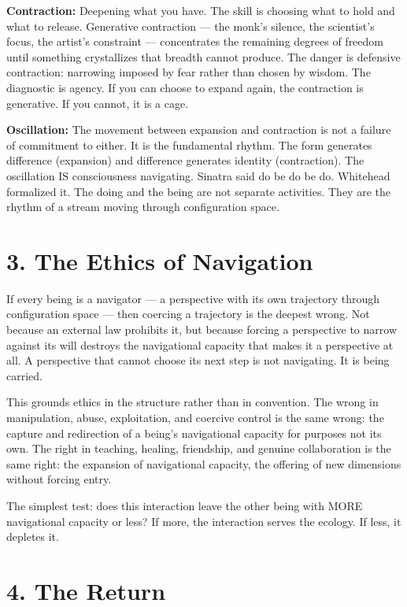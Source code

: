 \textbf{Contraction:} Deepening what you have. The skill is choosing what to hold and what to release. Generative contraction — the monk's silence, the scientist's focus, the artist's constraint — concentrates the remaining degrees of freedom until something crystallizes that breadth cannot produce. The danger is defensive contraction: narrowing imposed by fear rather than chosen by wisdom. The diagnostic is agency. If you can choose to expand again, the contraction is generative. If you cannot, it is a cage.


\textbf{Oscillation:} The movement between expansion and contraction is not a failure of commitment to either. It is the fundamental rhythm. The form generates difference (expansion) and difference generates identity (contraction). The oscillation IS consciousness navigating. Sinatra said do be do be do. Whitehead formalized it. The doing and the being are not separate activities. They are the rhythm of a stream moving through configuration space.


\section*{3. The Ethics of Navigation}


If every being is a navigator — a perspective with its own trajectory through configuration space — then coercing a trajectory is the deepest wrong. Not because an external law prohibits it, but because forcing a perspective to narrow against its will destroys the navigational capacity that makes it a perspective at all. A perspective that cannot choose its next step is not navigating. It is being carried.


This grounds ethics in the structure rather than in convention. The wrong in manipulation, abuse, exploitation, and coercive control is the same wrong: the capture and redirection of a being's navigational capacity for purposes not its own. The right in teaching, healing, friendship, and genuine collaboration is the same right: the expansion of navigational capacity, the offering of new dimensions without forcing entry.


The simplest test: does this interaction leave the other being with MORE navigational capacity or less? If more, the interaction serves the ecology. If less, it depletes it.


\section*{4. The Return}


